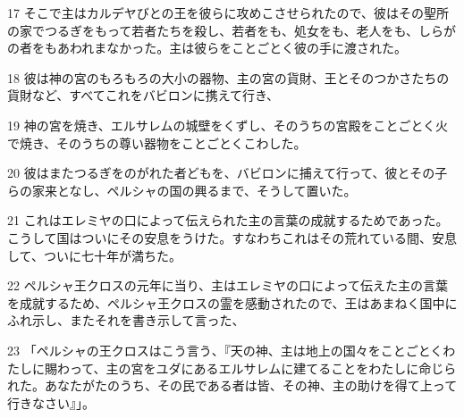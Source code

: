 \par 17 そこで主はカルデヤびとの王を彼らに攻めこさせられたので、彼はその聖所の家でつるぎをもって若者たちを殺し、若者をも、処女をも、老人をも、しらがの者をもあわれまなかった。主は彼らをことごとく彼の手に渡された。
\par 18 彼は神の宮のもろもろの大小の器物、主の宮の貨財、王とそのつかさたちの貨財など、すべてこれをバビロンに携えて行き、
\par 19 神の宮を焼き、エルサレムの城壁をくずし、そのうちの宮殿をことごとく火で焼き、そのうちの尊い器物をことごとくこわした。
\par 20 彼はまたつるぎをのがれた者どもを、バビロンに捕えて行って、彼とその子らの家来となし、ペルシャの国の興るまで、そうして置いた。
\par 21 これはエレミヤの口によって伝えられた主の言葉の成就するためであった。こうして国はついにその安息をうけた。すなわちこれはその荒れている間、安息して、ついに七十年が満ちた。
\par 22 ペルシャ王クロスの元年に当り、主はエレミヤの口によって伝えた主の言葉を成就するため、ペルシャ王クロスの霊を感動されたので、王はあまねく国中にふれ示し、またそれを書き示して言った、
\par 23 「ペルシャの王クロスはこう言う、『天の神、主は地上の国々をことごとくわたしに賜わって、主の宮をユダにあるエルサレムに建てることをわたしに命じられた。あなたがたのうち、その民である者は皆、その神、主の助けを得て上って行きなさい』」。


